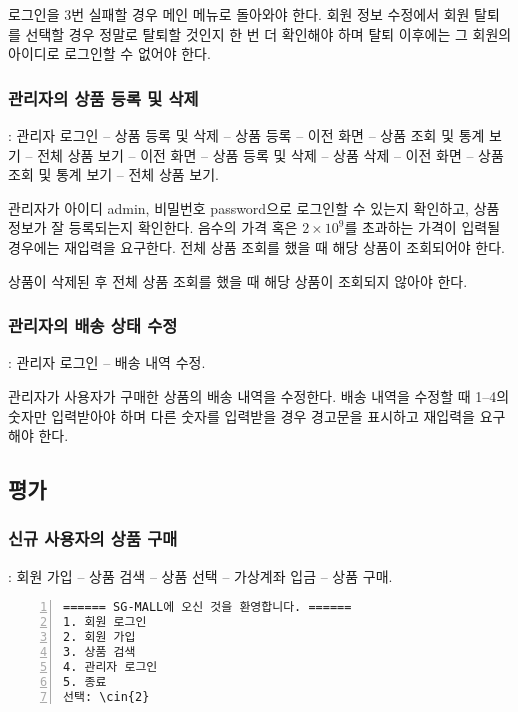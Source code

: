 \documentclass[runningheads]{llncs}
\newcommand{\cin}[1]{\textbf{\textcolor{orange}{#1}}}
\begin{document}
로그인을 3번 실패할 경우 메인 메뉴로 돌아와야 한다. 회원 정보 수정에서 회원 탈퇴를 선택할 경우 정말로 탈퇴할 것인지 한 번 더 확인해야 하며 탈퇴 이후에는 그 회원의 아이디로 로그인할 수 없어야 한다.

\subsubsection{관리자의 상품 등록 및 삭제}: 관리자 로그인 -- 상품 등록 및 삭제 -- 상품 등록 -- 이전 화면 -- 상품 조회 및 통계 보기 -- 전체 상품 보기 -- 이전 화면 -- 상품 등록 및 삭제 -- 상품 삭제 -- 이전 화면 -- 상품 조회 및 통계 보기 -- 전체 상품 보기.

관리자가 아이디 admin, 비밀번호 password으로 로그인할 수 있는지 확인하고, 상품 정보가 잘 등록되는지 확인한다. 음수의 가격 혹은 $2\times {10}^{9}$를 초과하는 가격이 입력될 경우에는 재입력을 요구한다. 전체 상품 조회를 했을 때 해당 상품이 조회되어야 한다.

상품이 삭제된 후 전체 상품 조회를 했을 때 해당 상품이 조회되지 않아야 한다.

\subsubsection{관리자의 배송 상태 수정}: 관리자 로그인 -- 배송 내역 수정.

관리자가 사용자가 구매한 상품의 배송 내역을 수정한다. 배송 내역을 수정할 때 1--4의 숫자만 입력받아야 하며 다른 숫자를 입력받을 경우 경고문을 표시하고 재입력을 요구해야 한다.

\subsection{평가}
\subsubsection{신규 사용자의 상품 구매}: 회원 가입 -- 상품 검색 -- 상품 선택 -- 가상계좌 입금 -- 상품 구매.

\begin{Verbatim}[frame=single,numbers=left,commandchars=\\\{\}]
====== SG-MALL에 오신 것을 환영합니다. ======
1. 회원 로그인
2. 회원 가입
3. 상품 검색
4. 관리자 로그인
5. 종료
선택: \cin{2}
\end{Verbatim}
\end{document}
